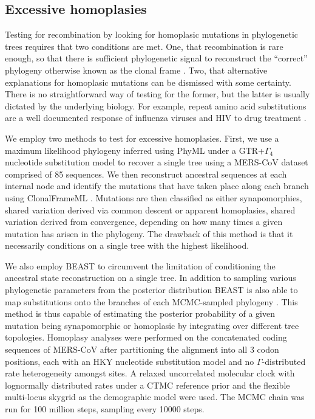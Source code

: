 \documentclass[11pt,oneside,letterpaper]{article}
\begin{document}
\subsection*{Excessive homoplasies}
Testing for recombination by looking for homoplasic mutations in phylogenetic trees requires that two conditions are met.
One, that recombination is rare enough, so that there is sufficient phylogenetic signal to reconstruct the ``correct'' phylogeny otherwise known as the clonal frame \citep{milkman_1990}.
Two, that alternative explanations for homoplasic mutations can be dismissed with some certainty.
There is no straightforward way of testing for the former, but the latter is usually dictated by the underlying biology.
For example, repeat amino acid substitutions are a well documented response of influenza viruses and HIV to drug treatment \citep{gubareva_2001,tisdale_1993,boucher_1993}.

We employ two methods to test for excessive homoplasies.
First, we use a maximum likelihood phylogeny inferred using PhyML \citep{guindon_2003} under a GTR+$\Gamma_{4}$ \citep{tavare_1986,yang_1994} nucleotide substitution model to recover a single tree using a MERS-CoV dataset comprised of 85 sequences.
We then reconstruct ancestral sequences at each internal node and identify the mutations that have taken place along each branch using ClonalFrameML \citep{didelot_2007}.
Mutations are then classified as either synapomorphies, shared variation derived via common descent or apparent homoplasies, shared variation derived from convergence, depending on how many times a given mutation has arisen in the phylogeny.
The drawback of this method is that it necessarily conditions on a single tree with the highest likelihood.

We also employ BEAST \citep{drummond_2012} to circumvent the limitation of conditioning the ancestral state reconstruction on a single tree.
In addition to sampling various phylogenetic parameters from the posterior distribution BEAST is also able to map substitutions onto the branches of each MCMC-sampled phylogeny \citep{obrien_2009}.
This method is thus capable of estimating the posterior probability of a given mutation being synapomorphic or homoplasic by integrating over different tree topologies.
Homoplasy analyses were performed on the concatenated coding sequences of MERS-CoV after partitioning the alignment into all 3 codon positions, each with an HKY nucleotide substitution model \citep{hky_1985} and no $\Gamma$-distributed rate heterogeneity amongst sites.
A relaxed uncorrelated molecular clock with lognormally distributed rates \citep{drummond_2006} under a CTMC reference prior \citep{ferreira_2008} and the flexible multi-locus skygrid as the demographic model \citep{gill_2013} were used.
The MCMC chain was run for 100 million steps, sampling every 10000 steps.
\end{document}
